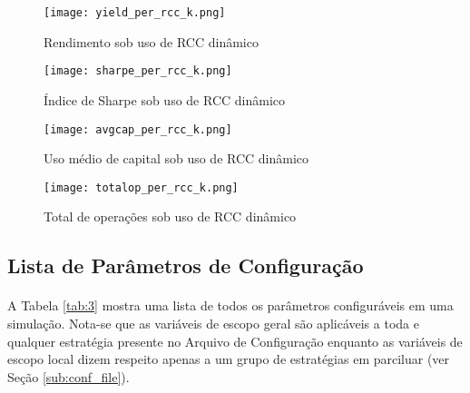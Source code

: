 \begin{figure}[!htb]
    \texttt{[image: yield\_per\_rcc\_k.png]}
    \centering
    \caption{Rendimento sob uso de RCC dinâmico}
    \label{fig:152}
\end{figure}

\begin{figure}[!htb]
    \texttt{[image: sharpe\_per\_rcc\_k.png]}
    \centering
    \caption{Índice de Sharpe sob uso de RCC dinâmico}
    \label{fig:153}
\end{figure}

\begin{figure}[!htb]
    \texttt{[image: avgcap\_per\_rcc\_k.png]}
    \centering
    \caption{Uso médio de capital sob uso de RCC dinâmico}
    \label{fig:154}
\end{figure}

\begin{figure}[!htb]
    \texttt{[image: totalop\_per\_rcc\_k.png]}
    \centering
    \caption{Total de operações sob uso de RCC dinâmico}
    \label{fig:155}
\end{figure}



\FloatBarrier
\subsection{Lista de Parâmetros de Configuração}
\label{sub:params_list}

\paragraph{} A Tabela \ref{tab:3} mostra uma lista de todos os parâmetros configuráveis em uma simulação. Nota-se que as variáveis de escopo geral são aplicáveis a toda e qualquer estratégia presente no Arquivo de Configuração enquanto as variáveis de escopo local dizem respeito apenas a um grupo de estratégias em parciluar (ver Seção \ref{sub:conf_file}).


